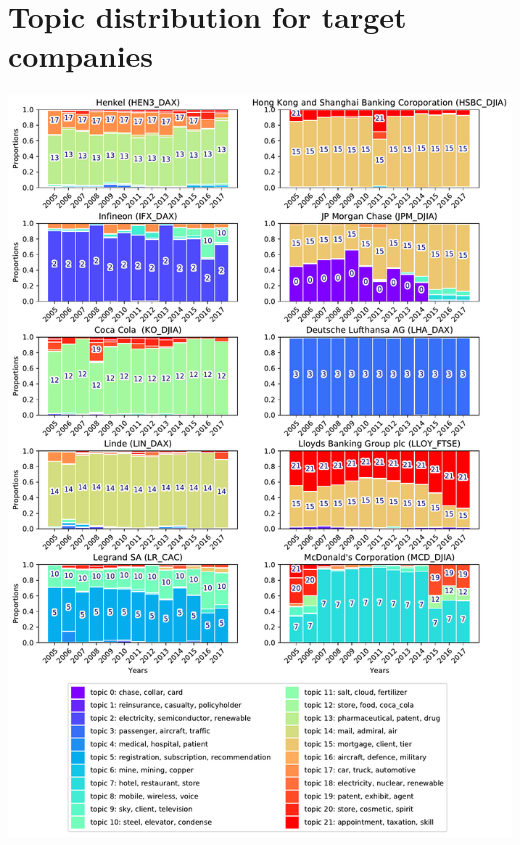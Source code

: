 \documentclass[12pt,journal,letterpaper,oneside,onecolumn]{IEEEtran}
\begin{document}
\section{Topic distribution for target companies}
\begin{center}
\includegraphics[width=0.85\linewidth]{images/companies_on_page_3.pdf}
\end{center}
\end{document}
